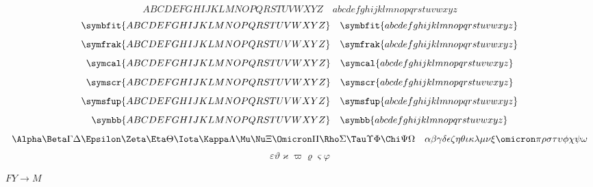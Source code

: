\documentclass[12pt, ThmSectionNumbering]{CrispyNotes}
\begin{document}
    \begin{equation*}
        ABCDEFGHIJKLMNOPQRSTUVWXYZ \quad abcdefghijklmnopqrstuvwxyz
    \end{equation*}
    \begin{equation*}
        \symbfit{ABCDEFGHIJKLMNOPQRSTUVWXYZ} \quad \symbfit{abcdefghijklmnopqrstuvwxyz}
    \end{equation*}
    \begin{equation*}
        \symfrak{ABCDEFGHIJKLMNOPQRSTUVWXYZ} \quad \symfrak{abcdefghijklmnopqrstuvwxyz}
    \end{equation*}
    \begin{equation*}
        \symcal{ABCDEFGHIJKLMNOPQRSTUVWXYZ} \quad \symcal{abcdefghijklmnopqrstuvwxyz}
    \end{equation*}
    \begin{equation*}
        \symscr{ABCDEFGHIJKLMNOPQRSTUVWXYZ} \quad \symscr{abcdefghijklmnopqrstuvwxyz}
    \end{equation*}
    \begin{equation*}
        \symsfup{ABCDEFGHIJKLMNOPQRSTUVWXYZ} \quad \symsfup{abcdefghijklmnopqrstuvwxyz}
    \end{equation*}
    \begin{equation*}
        \symbb{ABCDEFGHIJKLMNOPQRSTUVWXYZ} \quad \symbb{abcdefghijklmnopqrstuvwxyz}
    \end{equation*}
    \begin{equation*}
        \Alpha\Beta\Gamma\Delta\Epsilon\Zeta\Eta\Theta\Iota\Kappa\Lambda\Mu\Nu\Xi\Omicron\Pi\Rho\Sigma\Tau\Upsilon\Phi\Chi\Psi\Omega \quad \alpha\beta\gamma\delta\epsilon\zeta\eta\theta\iota\kappa\lambda\mu\nu\xi\omicron\pi\rho\sigma\tau\upsilon\phi\chi\psi\omega
    \end{equation*}
    \begin{equation*}
      \varepsilon\vartheta\varkappa\varpi\varrho\varsigma\varphi
    \end{equation*}
    
    \(FY\to M\)
\end{document}
